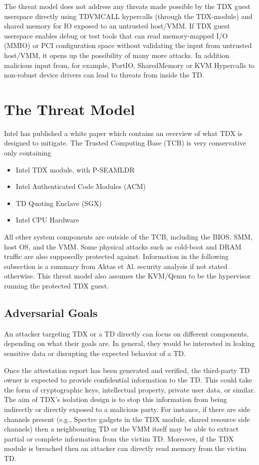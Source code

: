 The threat model does not address any threats made possible by the TDX guest userspace directly using TDVMCALL hypercalls (through the TDX-module) and shared memory for IO exposed to an untrusted host/VMM. If TDX guest userspace enables debug or test tools that can read memory-mapped I/O (MMIO) or PCI configuration space without validating the input from untrusted host/VMM, it opens up the possibility of many more attacks. In addition malicious input from, for example,  PortIO, SharedMemory or KVM Hypercalls to non-robust device drivers can lead to threats from inside the TD.

\section{The Threat Model}

Intel has published a white paper \cite{noauthor_tdx-whitepaper-february2022pdf_nodate} which contains an overview of what TDX is designed to mitigate. The Trusted Computing Base (TCB) is very conservative only containing 
\begin{itemize}
    \item Intel TDX module, with \Gls{P-SEAMLDR}
    \item Intel Authenticated Code Modules (ACM)
    \item TD Quoting Enclave (SGX)
    \item Intel CPU Hardware
    \cite{aktas_intel_nodate}
\end{itemize}
All other system components are outside of the TCB, including the BIOS, SMM, host OS, and the VMM. Some physical attacks such as cold-boot and DRAM traffic are also supposedly protected against. Information in the following subsection is a summary from Aktas et Al. security analysis\cite{aktas_intel_nodate} if not stated otherwise. This threat model also assumes the KVM/Qemu to be the hypervisor running the protected TDX guest.

\subsection{Adversarial Goals}
An attacker targeting TDX or a TD directly can focus on different components, depending on what their goals are. In general, they would be interested in leaking sensitive data or disrupting the expected behavior of a TD. 


Once the attestation report has been generated and verified, the third-party TD owner is expected to provide confidential information to the TD. This could take the form of cryptographic keys, intellectual property, private user data, or similar. The aim of TDX’s isolation design is to stop this information from being indirectly or directly exposed to a malicious party. For instance, if there are side channels present (e.g., Spectre gadgets in the TDX module, shared resource side channels) then a neighbouring TD or the VMM itself may be able to extract partial or complete information from the victim TD. Moreover, if the TDX module is breached then an attacker can directly read memory from the victim TD.

